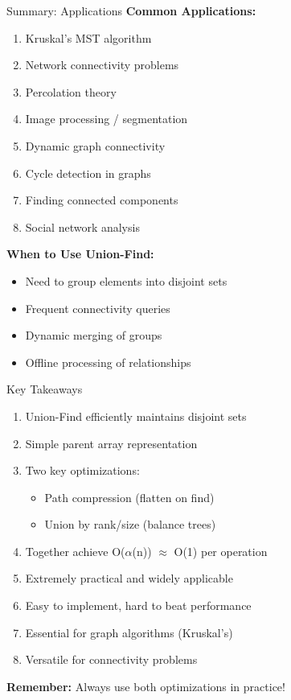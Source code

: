 \documentclass[aspectratio=169]{beamer}
\begin{document}
\begin{frame}{Summary: Applications}
  \textbf{Common Applications:}
  \begin{enumerate}
    \item Kruskal's MST algorithm
    \item Network connectivity problems
    \item Percolation theory
    \item Image processing / segmentation
    \item Dynamic graph connectivity
    \item Cycle detection in graphs
    \item Finding connected components
    \item Social network analysis
  \end{enumerate}

  \vspace{0.5cm}
  \textbf{When to Use Union-Find:}
  \begin{itemize}
    \item Need to group elements into disjoint sets
    \item Frequent connectivity queries
    \item Dynamic merging of groups
    \item Offline processing of relationships
  \end{itemize}
\end{frame}

\begin{frame}{Key Takeaways}
  \begin{enumerate}
    \item Union-Find efficiently maintains disjoint sets
    \item Simple parent array representation
    \item Two key optimizations:
      \begin{itemize}
        \item Path compression (flatten on find)
        \item Union by rank/size (balance trees)
      \end{itemize}
    \item Together achieve O($\alpha$(n)) $\approx$ O(1) per operation
    \item Extremely practical and widely applicable
    \item Easy to implement, hard to beat performance
    \item Essential for graph algorithms (Kruskal's)
    \item Versatile for connectivity problems
  \end{enumerate}

  \vspace{0.5cm}
  \textbf{Remember:} Always use both optimizations in practice!
\end{frame}
\end{document}
